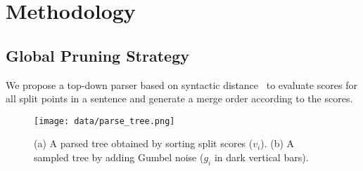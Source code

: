 \section{Methodology}

\subsection{Global Pruning Strategy}
We propose a top-down parser based on syntactic distance~\cite{DBLP:conf/acl/BengioSCJLS18} to evaluate scores for all split points in a sentence and generate a merge order according to the scores. 

\begin{figure}[htb!]
  \centering
  \texttt{[image: data/parse\_tree.png]}
  \caption{(a) A parsed tree obtained by sorting split scores ($v_i$). (b) A sampled tree by adding Gumbel noise ($g_i$ in dark vertical bars).}
  \label{fig:sample_demo}
\end{figure}

